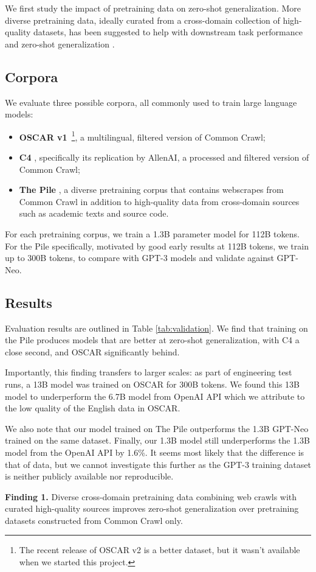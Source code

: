 We first study the impact of pretraining data on zero-shot generalization. More diverse pretraining data, ideally curated from a cross-domain collection of high-quality datasets, has been suggested to help with downstream task performance and zero-shot generalization \cite{rossettnlg, gao2020pile}. 

\subsection{Corpora} 
We evaluate three possible corpora, all commonly used to train large language models:
\begin{itemize}
    \item \textbf{OSCAR v1}~\citep{ortiz2019oscar}\footnote{The recent release of OSCAR v2 is a better dataset, but it wasn't available when we started this project.}, a multilingual, filtered version of Common Crawl;
    \item \textbf{C4} \citep{raffel2019t5}, specifically its replication by AllenAI, a processed and filtered version of Common Crawl;
    \item \textbf{The Pile} \citep{gao2020pile}, a diverse pretraining corpus that contains webscrapes from Common Crawl in addition to high-quality data from cross-domain sources such as academic texts and source code.
\end{itemize}

For each pretraining corpus, we train a 1.3B parameter model for 112B tokens. For the Pile specifically, motivated by good early results at 112B tokens, we train up to 300B tokens, to compare with GPT-3 models and validate against GPT-Neo. 

\subsection{Results}

Evaluation results are outlined in Table \ref{tab:validation}. We find that training on the Pile produces models that are better at zero-shot generalization, with C4 a close second, and OSCAR significantly behind. 

Importantly, this finding transfers to larger scales: as part of engineering test runs, a 13B model was trained on OSCAR for 300B tokens. 
We found this 13B model to underperform the 6.7B model from OpenAI API 
which we attribute to the low quality of the English data in OSCAR. 

We also note that our model trained on The Pile outperforms the 1.3B GPT-Neo trained on the same dataset. Finally, our 1.3B model still underperforms the 1.3B model from the OpenAI API by 1.6\%. It seems most likely that the difference is that of data, but we cannot investigate this further as the GPT-3 training dataset is neither publicly available nor reproducible.

\begin{mdframed}
\textbf{Finding 1.} Diverse cross-domain pretraining data combining web crawls with curated high-quality sources improves zero-shot generalization over pretraining datasets constructed from Common Crawl only.
\end{mdframed}
